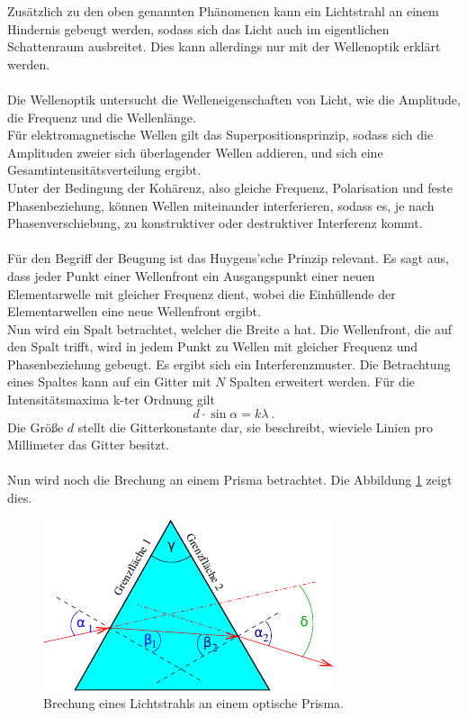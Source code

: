     Zusätzlich zu den oben genannten Phänomenen kann ein Lichtstrahl an einem Hindernis gebeugt werden,
    sodass sich das Licht auch im eigentlichen Schattenraum ausbreitet.
    Dies kann allerdings nur mit der Wellenoptik erklärt werden.\\
    \\
    Die Wellenoptik untersucht die Welleneigenschaften von Licht,
    wie die Amplitude, die Frequenz und die Wellenlänge.\\
    Für elektromagnetische Wellen gilt das Superpositionsprinzip,
    sodass sich die Amplituden zweier sich überlagender Wellen addieren,
    und sich eine Gesamtintensitätsverteilung ergibt.\\
    Unter der Bedingung der Kohärenz,
    also gleiche Frequenz, Polarisation und feste Phasenbeziehung,
    können Wellen miteinander interferieren,
    sodass es,
    je nach Phasenverschiebung,
    zu konstruktiver oder destruktiver Interferenz kommt.\\
    \\
    Für den Begriff der Beugung ist das Huygens'sche Prinzip relevant.
    Es sagt aus,
    dass jeder Punkt einer Wellenfront ein Ausgangspunkt einer neuen Elementarwelle mit gleicher Frequenz dient,
    wobei die Einhüllende der Elementarwellen eine neue Wellenfront ergibt.\\
    Nun wird ein Spalt betrachtet,
    welcher die Breite a hat.
    Die Wellenfront,
    die auf den Spalt trifft,
    wird in jedem Punkt zu Wellen mit gleicher Frequenz und Phasenbeziehung gebeugt.
    Es ergibt sich ein Interferenzmuster.
    Die Betrachtung eines Spaltes kann auf ein Gitter mit $N$ Spalten erweitert werden.
    Für die Intensitätsmaxima k-ter Ordnung gilt %
    \begin{equation}
        d \cdot \sin\alpha = k \lambda \ .
    \end{equation}
    Die Größe $d$ stellt die Gitterkonstante dar,
    sie beschreibt,
    wieviele Linien pro Millimeter das Gitter besitzt.\\
    \\
    Nun wird noch die Brechung an einem Prisma betrachtet.
    Die Abbildung \ref{fig:prisma} zeigt dies.
    \begin{figure}[H]
        \centering
        \includegraphics[scale=1]{content/img/Abb_6.pdf}
        \caption{Brechung eines Lichtstrahls an einem optische Prisma.}
        \label{fig:prisma}
    \end{figure}
